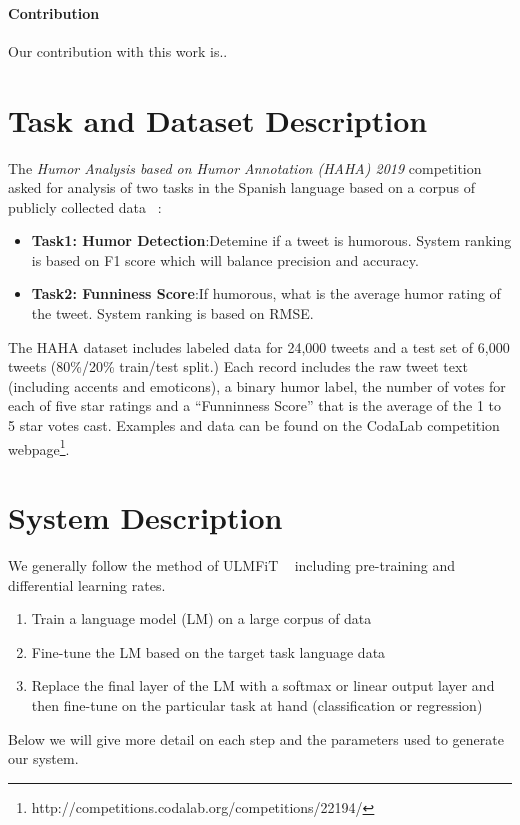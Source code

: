 \documentclass[smallextended]{svjour3}       %
\begin{document}
\paragraph{Contribution} Our contribution with this work is..

\section{Task and Dataset Description}
\label{sec:task}
The \textit{Humor Analysis based on Humor Annotation (HAHA) 2019}\cite{overview_haha2019} competition asked for analysis of two tasks in the Spanish language based on a corpus of publicly collected data ~\cite{castro2018crowd}:
\begin{itemize}
\item \textbf{Task1: Humor Detection}:Detemine if a tweet is humorous. System ranking is based on F1 score which will balance precision and accuracy.
\item \textbf{Task2: Funniness Score}:If humorous, what is the average humor rating of the tweet. System ranking is based on RMSE.
\end{itemize}
The HAHA dataset includes labeled data for 24,000 tweets and a test set of 6,000 tweets (80\%/20\% train/test split.)  Each record includes the raw tweet text (including accents and emoticons), a binary humor label, the number of votes for each of five star ratings and a ``Funninness Score'' that is the average of the 1 to 5 star votes cast.  Examples and data can be found on the CodaLab competition webpage\footnote{http://competitions.codalab.org/competitions/22194/}.

\section{System Description}
\label{sec:system}
We generally follow the method of ULMFiT ~\cite{HowardRuder:DBLP:journals/corr/abs-1801-06146} including pre-training and differential learning rates. 
\begin{enumerate}
	\item Train a language model (LM) on a large corpus of data
	\item Fine-tune the LM based on the target task language data
	\item Replace the final layer of the LM with a softmax or linear output layer and then fine-tune on the particular task at hand (classification or regression)
\end{enumerate}
Below we will give more detail on each step and the parameters used to generate our system.
\end{document}
